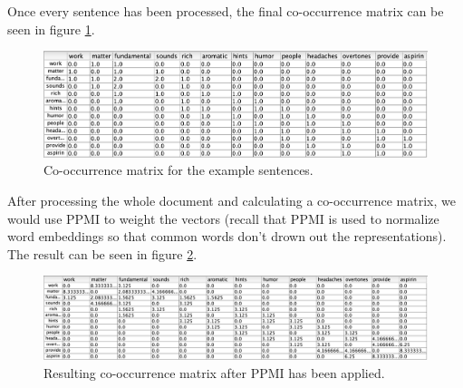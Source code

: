 Once every sentence has been processed, the final co-occurrence matrix can be seen in figure \ref{coocExample}.

\begin{figure}[h]
    \centering
    \includegraphics[scale=.5]{./images/full_cooc_matrix.png}
    \caption[Generated using Simbrain.]{Co-occurrence matrix for the example sentences.}
 \label{coocExample}
\end{figure}

After processing the whole document and calculating a co-occurrence matrix, we would use PPMI to weight the vectors (recall that PPMI is used to normalize word embeddings so that common words don't drown out the representations). The result can be seen in figure \ref{ppmiExample}.

\begin{figure}[h]
    \centering
    \includegraphics[scale=.45]{./images/weighted_cooc_matrix.png}
    \caption[Generated using Simbrain.]{Resulting co-occurrence matrix after PPMI has been applied.}
 \label{ppmiExample}
\end{figure}